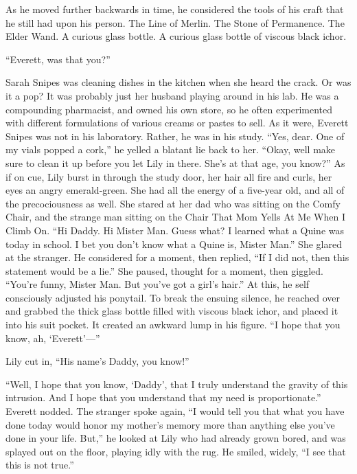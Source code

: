 As he moved further backwards in time, he considered the tools of his craft that he still had upon his person. The Line of Merlin. The Stone of Permanence. The Elder Wand. A curious glass bottle.
\SomeVSpace
A curious glass bottle of viscous black ichor.

\simpleline


“Everett, was that you?”

Sarah Snipes was cleaning dishes in the kitchen when she heard the crack. Or was it a pop? It was probably just her husband playing around in his lab. He was a compounding pharmacist, and owned his own store, so he often experimented with different formulations of various creams or pastes to sell.
\SmallVSpace
As it were, Everett Snipes was not in his laboratory. Rather, he was in his study. “Yes, dear. One of my vials popped a cork,” he yelled a blatant lie back to her.
\SmallVSpace
“Okay, well make sure to clean it up before you let Lily in there. She’s at that age, you know?”
\SmallVSpace
As if on cue, Lily burst in through the study door, her hair all fire and curls, her eyes an angry emerald-green. She had all the energy of a five-year old, and all of the precociousness as well. She stared at her dad who was sitting on the Comfy Chair, and the strange man sitting on the Chair That Mom Yells At Me When I Climb On. “Hi Daddy. Hi Mister Man. Guess what? I learned what a Quine was today in school. I bet you don’t know what a Quine is, Mister Man.”
\SmallVSpace
She glared at the stranger. He considered for a moment, then replied, “If I did not, then this statement would be a lie.”
\SmallVSpace
She paused, thought for a moment, then giggled. “You’re funny, Mister Man. But you’ve got a girl’s hair.” At this, he self consciously adjusted his ponytail. To break the ensuing silence, he reached over and grabbed the thick glass bottle filled with viscous black ichor, and placed it into his suit pocket. It created an awkward lump in his figure.
\SmallVSpace
“I hope that you know, ah, ‘Everett’\mbox{---}”

Lily cut in, “His name’s Daddy, you know!”

“Well, I hope that you know, ‘Daddy’, that I truly understand the gravity of this intrusion. And I hope that you understand that my need is proportionate.”
\SmallVSpace
Everett nodded.
\SmallVSpace
The stranger spoke again, “I would tell you that what you have done today would honor my mother’s memory more than anything else you’ve done in your life. But,” he looked at Lily who had already grown bored, and was splayed out on the floor, playing idly with the rug. He smiled, widely, “I see that this is not true.”

